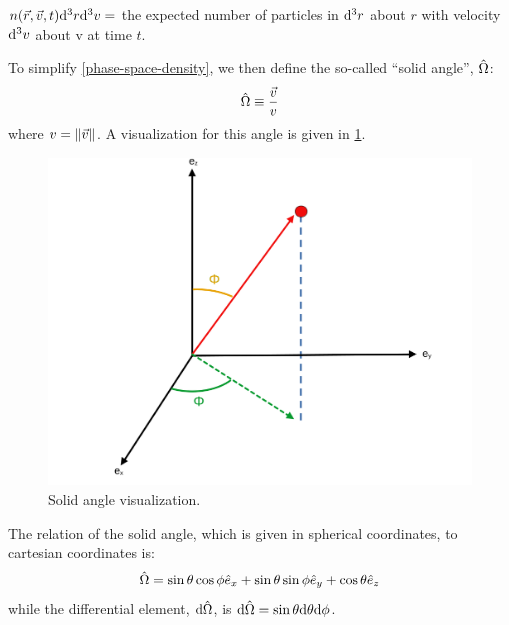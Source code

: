 \begin{definition}\label{phase-space-density}
  $n(\vec{r},\vec{v},t)\dd^3 r \dd^3 v=$ the expected number of particles in $\dd^3 r$ about $r$ with velocity $\dd^3 v$ about v at time $t$.
\end{definition}
To simplify \cref{phase-space-density}, we then define the so-called ``solid angle'', $\hat{\Omega}$:
\begin{equation} \label{eq:solid-angle}
  \hat{\Omega} \equiv \frac{\vec{v}}{v}
\end{equation}
where $v=\norm{\vec{v}}$.
A visualization for this angle is given in \cref{fig:solid-angle}.
\begin{figure}
  \centering
  \includegraphics[width=\textwidth]{figs/solid_angle.png}
  \caption{Solid angle visualization.}
  \label{fig:solid-angle}
\end{figure}
The relation of the solid angle, which is given in spherical coordinates, to cartesian coordinates is:
\begin{equation}
  \hat{\Omega} = \sin\theta \cos \phi \hat{e}_x+\sin\theta\sin\phi\hat{e}_y+\cos\theta\hat{e}_z
\end{equation}
while the differential element, $\dd \hat{\Omega}$, is $\dd \hat{\Omega}=\sin\theta \dd \theta \dd \phi$.


